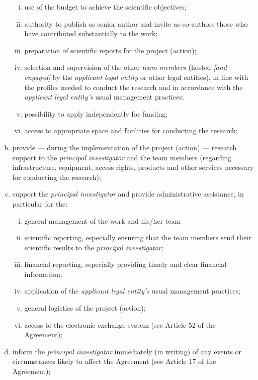 \documentclass[a4paper,10pt,ngerman,numbers=noenddot]{scrreprt}
\begin{document}
\begin{enumerate}[a)]
\begin{enumerate}[i)]
    \item use of the budget to achieve the scientific objectives;
    \item authority to publish as senior author and invite as co-authors those who have contributed substantially to the work;
    \item preparation of scientific reports for the project (action);
    \item selection and supervision of the other \textit{team members} (hosted \textit{[and engaged]} by the \textit{applicant legal entity} or other legal entities), in line with the profiles needed to conduct the research and in accordance with the \textit{applicant legal entity's} usual management practices;
    \item possibility to apply independently for funding;
    \item access to appropriate space and facilities for conducting the research;
\end{enumerate}
\item provide --- during the implementation of the project (action) --- research support to the \textit{principal investigator} and the team members (regarding infrastructure, equipment, access rights, products and other services necessary for conducting the research);
\item support the \textit{principal investigator} and provide administrative assistance, in particular for the:
\begin{enumerate}[i)]
    \item general management of the work and his/her team
    \item scientific reporting, especially ensuring that the team members send their scientific results to the \textit{principal investigator};
    \item financial reporting, especially providing timely and clear financial information;
    \item application of the \textit{applicant legal entity's} usual management practices;
    \item general logistics of the project (action);
    \item access to the electronic exchange system (see Article 52 of the Agreement);
\end{enumerate}
\item inform the \textit{principal investigator} immediately (in writing) of any events or circumstances likely to affect the Agreement (see Article 17 of the Agreement);

\end{enumerate}
\end{document}
